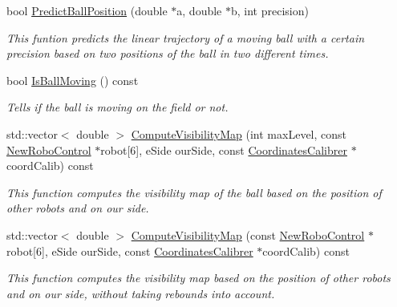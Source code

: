 \begin{DoxyCompactItemize}
bool \hyperlink{classBallMonitor_a914053314023ea79ee691a3031e355bf}{PredictBallPosition} (double $\ast$a, double $\ast$b, int precision)
\begin{DoxyCompactList}\small\item\em This funtion predicts the linear trajectory of a moving ball with a certain precision based on two positions of the ball in two different times. \item\end{DoxyCompactList}\item 
bool \hyperlink{classBallMonitor_a8995e71b82d80987984dd6b1ed89c0a0}{IsBallMoving} () const 
\begin{DoxyCompactList}\small\item\em Tells if the ball is moving on the field or not. \item\end{DoxyCompactList}\item 
std::vector$<$ double $>$ \hyperlink{classBallMonitor_aad046acf9df6b0381ab3b1b8351e97c5}{ComputeVisibilityMap} (int maxLevel, const \hyperlink{classNewRoboControl}{NewRoboControl} $\ast$robot\mbox{[}6\mbox{]}, eSide ourSide, const \hyperlink{classCoordinatesCalibrer}{CoordinatesCalibrer} $\ast$coordCalib) const 
\begin{DoxyCompactList}\small\item\em This function computes the visibility map of the ball based on the position of other robots and on our side. \item\end{DoxyCompactList}\item 
std::vector$<$ double $>$ \hyperlink{classBallMonitor_ac30119e22cfe4814670c4eae8c6b5495}{ComputeVisibilityMap} (const \hyperlink{classNewRoboControl}{NewRoboControl} $\ast$robot\mbox{[}6\mbox{]}, eSide ourSide, const \hyperlink{classCoordinatesCalibrer}{CoordinatesCalibrer} $\ast$coordCalib) const 
\begin{DoxyCompactList}\small\item\em This function computes the visibility map based on the position of other robots and on our side, without taking rebounds into account. \item\end{DoxyCompactList}\end{DoxyCompactItemize}
